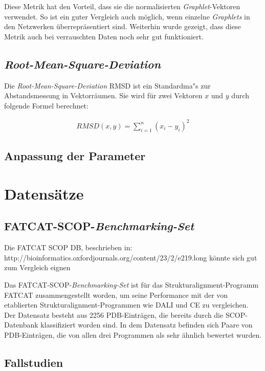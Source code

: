 \documentclass{report}
\begin{document}
Diese Metrik hat den Vorteil, dass sie die normalisierten \textit{Graphlet}-Vektoren verwendet. So ist ein guter Vergleich auch m\"oglich, wenn einzelne \textit{Graphlets} in den Netzwerken \"uberrepr\"asentiert sind.
Weiterhin wurde gezeigt, \cite{frqdistribution} dass diese Metrik auch bei verrauschten Daten noch sehr gut funktioniert.

\subsection{\textit{Root-Mean-Square-Deviation}}

Die \textit{Root-Mean-Square-Deviation} RMSD ist ein Standardma"s zur Abstandsmessung in Vektorr\"aumen. Sie wird f\"ur zwei Vektoren $x$ und $y$ durch folgende Formel berechnet:

\begin{subequations}
\label{eq:rmsd}
\begin{align}
RMSD(x,y) = \sum_{i=1}^{n} (x_i - y_i)^2
\end{align}
\end{subequations}

\subsection{Anpassung der Parameter}

\section{Datens\"atze}


\subsection{FATCAT-SCOP-\textit{Benchmarking-Set}}

Die FATCAT SCOP DB, beschrieben in: http://bioinformatics.oxfordjournals.org/content/23/2/e219.long
k\"onnte sich gut zum Vergleich eignen

Das FATCAT-SCOP-\textit{Benchmarking-Set} ist f\"ur das Strukturalignment-Programm FATCAT \cite{fatcat} zusammengestellt worden, um seine Performance mit der von etablierten Strukturalignment-Programmen wie DALI und CE zu vergleichen. Der Datensatz besteht aus 2256 PDB-Eintr\"agen, die bereits durch die SCOP-Datenbank klassifiziert worden sind.
In dem Datensatz befinden sich Paare von PDB-Eintr\"agen, die von allen drei Programmen als sehr \"ahnlich bewertet wurden. 


\subsection{Fallstudien}
\end{document}
